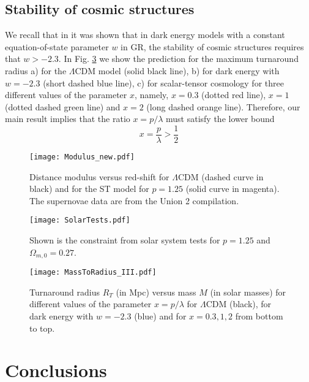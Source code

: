 
\subsection{Stability of cosmic structures}

We recall that in 
\cite{tomaras1,tomaras2} it was shown that
in dark energy models with a constant equation-of-state parameter $w$ in GR, the stability of cosmic structures requires that $w > -2.3$.
In Fig. \ref{fig:6} we show the prediction for the maximum turnaround radius a) for the $\Lambda$CDM model (solid black line), b) for dark energy with $w=-2.3$ (short dashed blue line), c) for scalar-tensor cosmology for three different values of the parameter $x$, namely, $x=0.3$ (dotted red line), $x=1$ (dotted dashed green line) and $x=2$ (long dashed orange line). Therefore, our main result implies that the ratio $x=p/\lambda$ must satisfy the lower bound
\begin{equation}
x=\frac{p}{\lambda} > \frac{1}{2}
\end{equation}
%
\begin{figure}[ht!]
\centering
\texttt{[image: Modulus\_new.pdf]}
\caption{\label{fig:4} 
Distance modulus versus red-shift for $\Lambda$CDM (dashed curve in black) and for the ST model for $p=1.25$ (solid curve in magenta). The supernovae data are from the Union 2 compilation.
}
\end{figure}

\begin{figure}[ht!]
\centering
\texttt{[image: SolarTests.pdf]}
\caption{\label{fig:5} 
Shown is the constraint from solar system tests for $p=1.25$ and $\Omega_{m,0}=0.27$.
}
\end{figure}

\begin{figure}[ht!]
\centering
\texttt{[image: MassToRadius\_III.pdf]}
\caption{\label{fig:6} 
Turnaround radius $R_T$ (in Mpc) versus mass $M$ (in solar masses)
for different values of the parameter $x=p/\lambda$ for $\Lambda$CDM (black), for dark energy with $w=-2.3$ (blue) and for $x=0.3,1,2$ from bottom to top.
}
\end{figure}


\section{Conclusions}\label{Conclusions}

